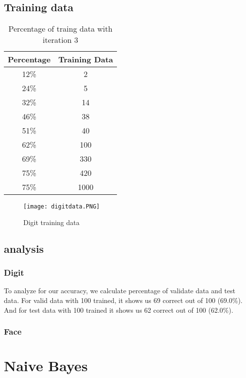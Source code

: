 \documentclass{article}
\begin{document}
    \subsection{Training data}
        \begin{table}[h]
            \centering
            \begin{tabular}{c|c}
                \hline
                    Percentage & Training Data \\
                \hline
                    12\% & 2\\
                \hline
                    24\% & 5\\
                \hline
                    32\% & 14\\
                \hline
                    46\% & 38\\
                \hline
                    51\% & 40\\
                \hline
                    62\% & 100\\
                \hline
                    69\% & 330\\
                \hline
                    75\% & 420\\
                \hline
                    75\% & 1000\\
                \hline
            \end{tabular}
            \caption{Percentage of traing data with iteration 3}
        \end{table}
        \newpage
        \begin{figure}[h]
            \centering
                \texttt{[image: digitdata.PNG]}
            \caption{Digit training data}
        \end{figure}
        
    \subsection{analysis}
        \subsubsection{Digit}
            To analyze for our accuracy, we calculate percentage of validate data and test data. \newline
            For valid data with 100 trained, it shows us 69 correct out of 100 (69.0\%). And for test data with 100 trained it shows us 62 correct out of 100 (62.0\%).
        \subsubsection{Face}


\section{Naive Bayes}
\end{document}
